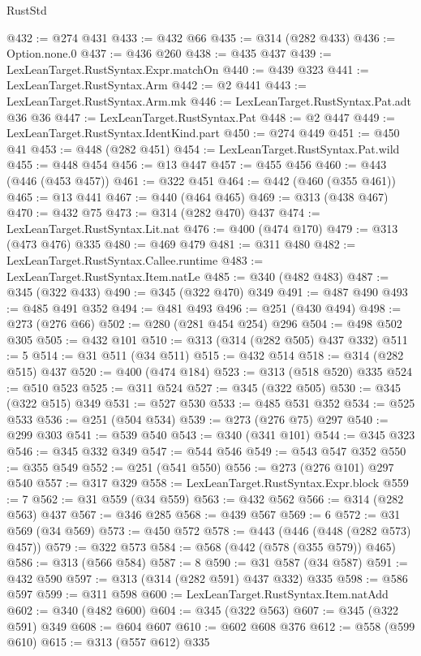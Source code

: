 \begin{lexlean}{RustStd}
\begin{coremodule}
{\begin{coremodule}
{{{{{{{{{@432 := @274 @431
@433 := @432 @66
@435 := @314 (@282 @433)
@436 := Option.none.{0}
@437 := @436 @260
@438 := @435 @437
@439 := LexLeanTarget.RustSyntax.Expr.matchOn
@440 := @439 @323
@441 := LexLeanTarget.RustSyntax.Arm
@442 := @2 @441
@443 := LexLeanTarget.RustSyntax.Arm.mk
@446 := LexLeanTarget.RustSyntax.Pat.adt @36 @36
@447 := LexLeanTarget.RustSyntax.Pat
@448 := @2 @447
@449 := LexLeanTarget.RustSyntax.IdentKind.part
@450 := @274 @449
@451 := @450 @41
@453 := @448 (@282 @451)
@454 := LexLeanTarget.RustSyntax.Pat.wild
@455 := @448 @454
@456 := @13 @447
@457 := @455 @456
@460 := @443 (@446 (@453 @457))
@461 := @322 @451
@464 := @442 (@460 (@355 @461))
@465 := @13 @441
@467 := @440 (@464 @465)
@469 := @313 (@438 @467)
@470 := @432 @75
@473 := @314 (@282 @470) @437
@474 := LexLeanTarget.RustSyntax.Lit.nat
@476 := @400 (@474 @170)
@479 := @313 (@473 @476) @335
@480 := @469 @479
@481 := @311 @480
@482 := LexLeanTarget.RustSyntax.Callee.runtime
@483 := LexLeanTarget.RustSyntax.Item.natLe
@485 := @340 (@482 @483)
@487 := @345 (@322 @433)
@490 := @345 (@322 @470) @349
@491 := @487 @490
@493 := @485 @491 @352
@494 := @481 @493
@496 := @251 (@430 @494)
@498 := @273 (@276 @66)
@502 := @280 (@281 @454 @254) @296
@504 := @498 @502 @305
@505 := @432 @101
@510 := @313 (@314 (@282 @505) @437 @332)
@511 := 5
@514 := @31 @511 (@34 @511)
@515 := @432 @514
@518 := @314 (@282 @515) @437
@520 := @400 (@474 @184)
@523 := @313 (@518 @520) @335
@524 := @510 @523
@525 := @311 @524
@527 := @345 (@322 @505)
@530 := @345 (@322 @515) @349
@531 := @527 @530
@533 := @485 @531 @352
@534 := @525 @533
@536 := @251 (@504 @534)
@539 := @273 (@276 @75) @297
@540 := @299 @303
@541 := @539 @540
@543 := @340 (@341 @101)
@544 := @345 @323
@546 := @345 @332 @349
@547 := @544 @546
@549 := @543 @547 @352
@550 := @355 @549
@552 := @251 (@541 @550)
@556 := @273 (@276 @101) @297 @540
@557 := @317 @329
@558 := LexLeanTarget.RustSyntax.Expr.block
@559 := 7
@562 := @31 @559 (@34 @559)
@563 := @432 @562
@566 := @314 (@282 @563) @437
@567 := @346 @285
@568 := @439 @567
@569 := 6
@572 := @31 @569 (@34 @569)
@573 := @450 @572
@578 := @443 (@446 (@448 (@282 @573) @457))
@579 := @322 @573
@584 := @568 (@442 (@578 (@355 @579)) @465)
@586 := @313 (@566 @584)
@587 := 8
@590 := @31 @587 (@34 @587)
@591 := @432 @590
@597 := @313 (@314 (@282 @591) @437 @332) @335
@598 := @586 @597
@599 := @311 @598
@600 := LexLeanTarget.RustSyntax.Item.natAdd
@602 := @340 (@482 @600)
@604 := @345 (@322 @563)
@607 := @345 (@322 @591) @349
@608 := @604 @607
@610 := @602 @608 @376
@612 := @558 (@599 @610)
@615 := @313 (@557 @612) @335
}}}}}}}}}
\end{coremodule}}
\end{coremodule}
\end{lexlean}
